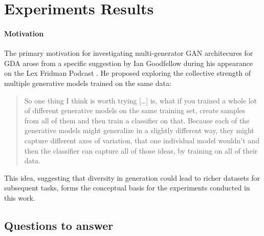 \section{Experiments Results}\label{body_experiments_results}
\paragraph{Motivation}\label{par_EXP_durch_motiv}
The primary motivation for investigating multi-generator GAN architecures for GDA arose from a specific suggestion by Ian Goodfellow during his appearance on the Lex Fridman Podcast \cite{fridman2019Goodfellow}. He proposed exploring the collective strength of multiple generative models trained on the same data:

\begin{quotation}
    So one thing I think is worth trying [\dots] is, what if you trained a whole lot of different generative models on the same training set, create samples from all of them and then train a classifier on that. Because each of the generative models might generalize in a slightly different way, they might capture different axes of variation, that one individual model wouldn't and then the classifier can capture all of those ideas, by training on all of their data.
\end{quotation}\citep[50:37]{fridman2019Goodfellow}

This idea, suggesting that diversity in generation could lead to richer datasets for subsequent tasks, forms the conceptual basis for the experiments conducted in this work.

\subsection{Questions to answer}




\newpage
